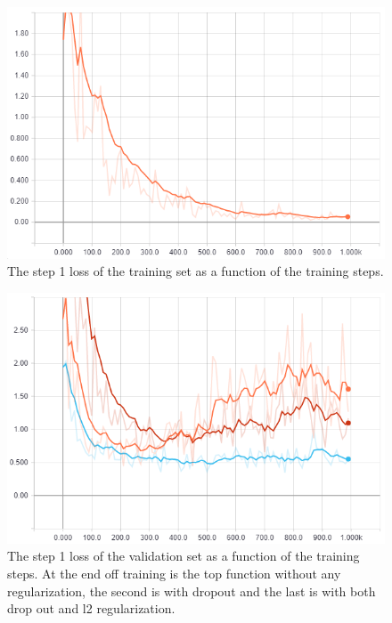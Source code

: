 \begin{figure}
	\centering
	\includegraphics[width=\textwidth]{sections/experiments/loss_on_trainset}
	\caption{The step 1 loss of the training set as a function of the training steps.}
	\label{fig:train_loss}
\end{figure}

\begin{figure}
	\centering
	\includegraphics[width=\textwidth]{sections/experiments/regularization}
	\caption{The step 1 loss of the validation set as a function of the training steps.
	At the end off training is the top function without any regularization, 
	the second is with dropout and the last is with both drop out and 
	l2 regularization.}
	\label{fig:regularization}
\end{figure}

